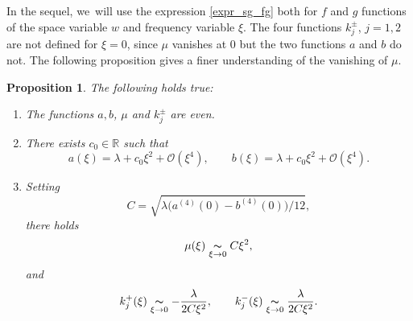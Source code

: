 \documentclass[10pt]{amsart}
\newtheorem{prop}[theorem]{Proposition}
\theoremstyle{definition}
\newcommand\R{\mathbb R}
\newcommand{\simx}[2]{\underset{#1\to#2}{\thicksim}}
\begin{document}
In the sequel, we~will use the expression \eqref{expr_sg_fg} both for $f$ and $g$ functions of the space variable $w$ and frequency variable $\xi$.
The four functions $k_j^\pm$, $j=1,2$ are not defined for $\xi=0$, since $\mu$ vanishes at $0$ but the two functions $a$ and $b$ do not. The following proposition gives a finer understanding of the vanishing of $\mu$.

\begin{prop}\label{prop_equiv_mu}
The following holds true:
\begin{enumerate}
\item The functions $a,b$, $\mu$ and $k_j^\pm$ are even.
\item There exists $c_0 \in \R$ such that
\[
a(\xi)= \lambda +c_0 \xi^2+ \mathcal{O}(\xi^4), \qquad b(\xi)= \lambda +c_0 \xi^2+ \mathcal{O}(\xi^4).
\]
\item Setting
\[
C = \sqrt{{\lambda}\bigl(a^{(4)}(0)-b^{(4)}(0)\bigr)/12},
\]
there holds
\begin{equation}\label{equiv_mu}
\mu(\xi) \simx{\xi}{0} C\xi^2,
\end{equation}
and
\begin{equation}\label{equiv_fcts_k}
k_j^+(\xi) \simx{\xi}{0} -\frac{\lambda}{2C\xi^2}, \qquad k_j^-(\xi) \simx{\xi}{0} \frac{\lambda}{2C\xi^2}.
\end{equation}
\end{enumerate}
\end{prop}
\end{document}
